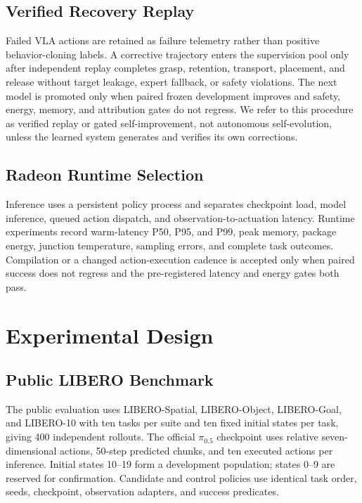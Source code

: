 \documentclass[11pt]{article}
\begin{document}
\subsection{Verified Recovery Replay}

Failed VLA actions are retained as failure telemetry rather than positive
behavior-cloning labels. A corrective trajectory enters the supervision pool
only after independent replay completes grasp, retention, transport, placement,
and release without target leakage, expert fallback, or safety violations. The
next model is promoted only when paired frozen development improves and safety,
energy, memory, and attribution gates do not regress. We refer to this procedure
as verified replay or gated self-improvement, not autonomous self-evolution,
unless the learned system generates and verifies its own corrections.

\subsection{Radeon Runtime Selection}

Inference uses a persistent policy process and separates checkpoint load, model
inference, queued action dispatch, and observation-to-actuation latency. Runtime
experiments record warm-latency P50, P95, and P99, peak memory, package energy,
junction temperature, sampling errors, and complete task outcomes. Compilation
or a changed action-execution cadence is accepted only when paired success does
not regress and the pre-registered latency and energy gates both pass.

\section{Experimental Design}

\subsection{Public LIBERO Benchmark}

The public evaluation uses LIBERO-Spatial, LIBERO-Object, LIBERO-Goal, and
LIBERO-10 with ten tasks per suite and ten fixed initial states per task, giving
400 independent rollouts. The official $\pi_{0.5}$ checkpoint uses relative
seven-dimensional actions, 50-step predicted chunks, and ten executed actions per
inference. Initial states 10--19 form a development population; states 0--9 are
reserved for confirmation. Candidate and control policies use identical task
order, seeds, checkpoint, observation adapters, and success predicates.
\end{document}
